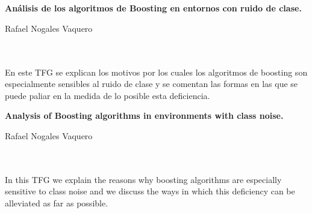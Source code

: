 \chapter*{}






\cleardoublepage
\thispagestyle{empty}

\begin{center}
{\large\bfseries Análisis de los algoritmos de Boosting en entornos con ruido de clase.}\\
\end{center}
\begin{center}
Rafael Nogales Vaquero \\
\end{center}

\\

\vspace{0.7cm}
\\

En este TFG se explican los motivos por los cuales los algoritmos de boosting son especialmente sensibles al ruido de clase y se comentan las formas en las que se puede paliar en la medida de lo posible esta deficiencia.\cleardoublepage


\thispagestyle{empty}


\begin{center}
{\large\bfseries Analysis of Boosting algorithms in environments with class noise.}\\
\end{center}
\begin{center}
Rafael Nogales Vaquero\\
\end{center}

\\

\vspace{0.7cm}
\\
In this TFG we explain the reasons why boosting algorithms are especially sensitive to class noise and we discuss the ways in which this deficiency can be alleviated as far as possible.

